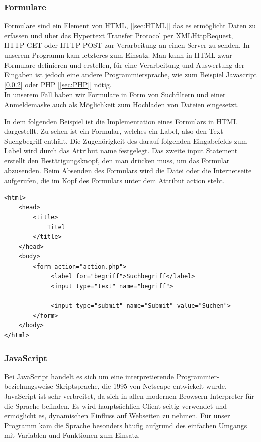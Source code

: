 \documentclass[12pt,a4paper,bibliography=totocnumbered,listof=totocnumbered]{scrartcl}
\begin{document}
\subsubsection{Formulare}
\label{sec:Formulare}
Formulare sind ein Element von HTML, [\ref{sec:HTML}] das es ermöglicht Daten zu erfassen und über das Hypertext Transfer Protocol per XMLHttpRequest, HTTP-GET oder HTTP-POST zur Verarbeitung an einen Server zu senden.\cite{Webformular} In unserem Programm kam letzteres zum Einsatz. Man kann in HTML zwar Formulare definieren und erstellen, für eine Verarbeitung und Auswertung der Eingaben ist jedoch eine andere Programmiersprache, wie zum Beispiel Javascript [\ref{sec:JavaScript}] oder PHP [\ref{sec:PHP}] nötig.\cite{HTML/Formulare/Form} \\
In unserem Fall haben wir Formulare in Form von Suchfiltern und einer Anmeldemaske auch als Möglichkeit zum Hochladen von Dateien eingesetzt.\pagebreak

In dem folgenden Beispiel ist die Implementation eines Formulars in HTML dargestellt. Zu sehen ist ein Formular, welches ein Label, also den Text \glqq Suchgbegriff\grqq{} enthält. Die Zugehörigkeit des darauf folgenden Eingabefelds zum Label wird durch das Attribut \glqq name\grqq{} festgelegt. Das zweite \glqq input\grqq{} Statement erstellt den Bestätigungsknopf, den man drücken muss, um das Formular abzusenden. Beim Absenden des Formulars wird die Datei oder die Internetseite aufgerufen, die im Kopf des Formulars unter dem Attribut \glqq action\grqq{} steht.

\vspace{1em}
\begin{lstlisting}[caption= Beispiel für Formulare in HTML, label=lst:HTML]
<html>
	<head>
		<title>
			Titel
		</title>
	</head>
	<body>
		<form action="action.php">
 			 <label for="begriff">Suchbegriff</label>
	 		 <input type="text" name="begriff">
	 		 
	 		 <input type="submit" name="Submit" value="Suchen">
		</form>
	</body>
</html>
\end{lstlisting}

\subsubsection{JavaScript}
\label{sec:JavaScript}
Bei JavaScript handelt es sich um eine interpretierende Programmier- beziehungsweise Skriptsprache, die 1995 von Netscape entwickelt wurde.\cite{JavaScript}\cite{wiki/JavaScript} JavaScript ist sehr verbreitet, da sich in allen modernen Browsern Interpreter für die Sprache befinden. Es wird hauptsächlich Client-seitig verwendet und ermöglicht es, dynamischen Einfluss auf Webseiten zu nehmen.\cite{JavaScript-JS} Für unser Programm kam die Sprache besonders häufig aufgrund des einfachen Umgangs mit Variablen und Funktionen zum Einsatz.
\end{document}

